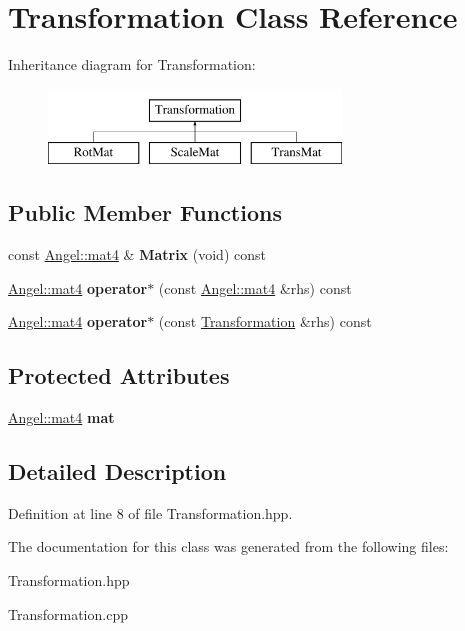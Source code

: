 \hypertarget{class_transformation}{\section{Transformation Class Reference}
\label{class_transformation}
}
Inheritance diagram for Transformation\-:\begin{figure}[H]
\begin{center}
\leavevmode
\includegraphics[height=2.000000cm]{class_transformation}
\end{center}
\end{figure}
\subsection*{Public Member Functions}
\begin{DoxyCompactItemize}
\item 
\hypertarget{class_transformation_ae6a57a1ee74ca1da1b8aef3d328a8772}{const \hyperlink{class_angel_1_1mat4}{Angel\-::mat4} \& {\bfseries Matrix} (void) const }\label{class_transformation_ae6a57a1ee74ca1da1b8aef3d328a8772}

\item 
\hypertarget{class_transformation_afdfbf48815a5b0d885f3b93f04cd2c66}{\hyperlink{class_angel_1_1mat4}{Angel\-::mat4} {\bfseries operator$\ast$} (const \hyperlink{class_angel_1_1mat4}{Angel\-::mat4} \&rhs) const }\label{class_transformation_afdfbf48815a5b0d885f3b93f04cd2c66}

\item 
\hypertarget{class_transformation_a85b923e0066365ef2e4aec3671396410}{\hyperlink{class_angel_1_1mat4}{Angel\-::mat4} {\bfseries operator$\ast$} (const \hyperlink{class_transformation}{Transformation} \&rhs) const }\label{class_transformation_a85b923e0066365ef2e4aec3671396410}

\end{DoxyCompactItemize}
\subsection*{Protected Attributes}
\begin{DoxyCompactItemize}
\item 
\hypertarget{class_transformation_a5f39fb578a1cdf78ca85efbd932d3834}{\hyperlink{class_angel_1_1mat4}{Angel\-::mat4} {\bfseries mat}}\label{class_transformation_a5f39fb578a1cdf78ca85efbd932d3834}

\end{DoxyCompactItemize}


\subsection{Detailed Description}


Definition at line 8 of file Transformation.\-hpp.



The documentation for this class was generated from the following files\-:\begin{DoxyCompactItemize}
\item 
Transformation.\-hpp\item 
Transformation.\-cpp\end{DoxyCompactItemize}
